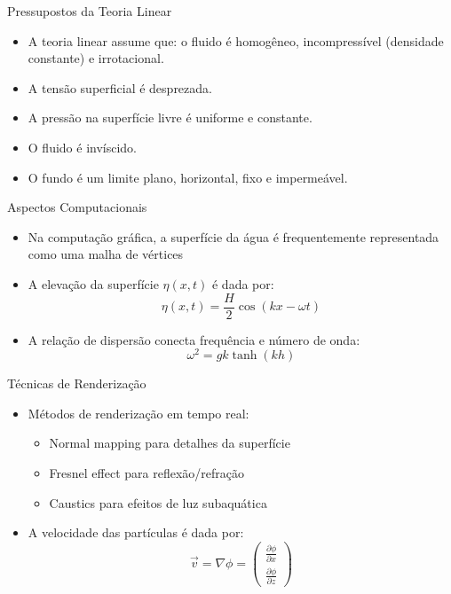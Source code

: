 \documentclass[aspectratio=169,xcolor=table]{beamer}
\begin{document}
\begin{frame}{Pressupostos da Teoria Linear}
    \begin{itemize}
        \item A teoria linear assume que: o fluido é homogêneo, incompressível (densidade constante) e irrotacional.
        \item A tensão superficial é desprezada.
        \item A pressão na superfície livre é uniforme e constante.
        \item O fluido é invíscido.
        \item O fundo é um limite plano, horizontal, fixo e impermeável.
    \end{itemize}
\end{frame}

\begin{frame}{Aspectos Computacionais}
    \begin{itemize}
        \item Na computação gráfica, a superfície da água é frequentemente representada como uma malha de vértices
        \item A elevação da superfície $\eta(x,t)$ é dada por:
        \[\eta(x,t) = \frac{H}{2}\cos(kx-\omega t)\]
        \item A relação de dispersão conecta frequência e número de onda:
        \[\omega^2 = gk\tanh(kh)\]
    \end{itemize}
\end{frame}

\begin{frame}{Técnicas de Renderização}
    \begin{itemize}
        \item Métodos de renderização em tempo real:
        \begin{itemize}
            \item Normal mapping para detalhes da superfície
            \item Fresnel effect para reflexão/refração
            \item Caustics para efeitos de luz subaquática
        \end{itemize}
        \item A velocidade das partículas é dada por:
        \[\vec{v} = \nabla\phi = \begin{pmatrix}
            \frac{\partial \phi}{\partial x} \\
            \frac{\partial \phi}{\partial z}
        \end{pmatrix}\]
    \end{itemize}
\end{frame}
\end{document}
